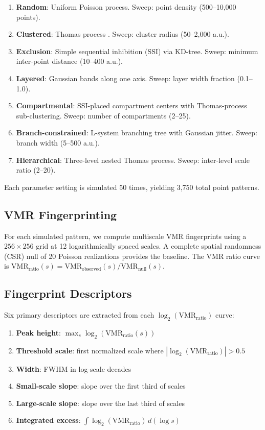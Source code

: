 \documentclass[11pt,a4paper]{article}
\newcommand{\vmr}{\mathrm{VMR}}
\begin{document}
\begin{enumerate}
  \item \textbf{Random}: Uniform Poisson process. Sweep: point density
    (500--10,000 points).
  \item \textbf{Clustered}: Thomas process \citep{Thomas1949}. Sweep:
    cluster radius (50--2,000 a.u.).
  \item \textbf{Exclusion}: Simple sequential inhibition (SSI) via KD-tree.
    Sweep: minimum inter-point distance (10--400 a.u.).
  \item \textbf{Layered}: Gaussian bands along one axis. Sweep: layer
    width fraction (0.1--1.0).
  \item \textbf{Compartmental}: SSI-placed compartment centers with
    Thomas-process sub-clustering. Sweep: number of compartments (2--25).
  \item \textbf{Branch-constrained}: L-system branching tree with Gaussian
    jitter. Sweep: branch width (5--500 a.u.).
  \item \textbf{Hierarchical}: Three-level nested Thomas process. Sweep:
    inter-level scale ratio (2--20).
\end{enumerate}

Each parameter setting is simulated 50 times, yielding 3,750 total point
patterns.

\subsection{VMR Fingerprinting}

For each simulated pattern, we compute multiscale VMR fingerprints using a
$256 \times 256$ grid at 12 logarithmically spaced scales. A complete
spatial randomness (CSR) null of 20 Poisson realizations provides the
baseline. The VMR ratio curve is $\vmr_\text{ratio}(s) =
\vmr_\text{observed}(s) / \vmr_\text{null}(s)$.

\subsection{Fingerprint Descriptors}

Six primary descriptors are extracted from each $\log_2(\vmr_\text{ratio})$
curve:

\begin{enumerate}
  \item \textbf{Peak height}: $\max_s \log_2(\vmr_\text{ratio}(s))$
  \item \textbf{Threshold scale}: first normalized scale where
    $|\log_2(\vmr_\text{ratio})| > 0.5$
  \item \textbf{Width}: FWHM in log-scale decades
  \item \textbf{Small-scale slope}: slope over the first third of scales
  \item \textbf{Large-scale slope}: slope over the last third of scales
  \item \textbf{Integrated excess}: $\int \log_2(\vmr_\text{ratio})\,
    d(\log s)$
\end{enumerate}
\end{document}

